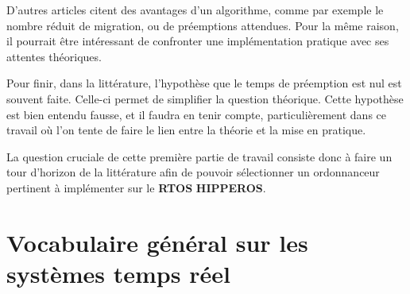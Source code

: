 \documentclass[11pt,a4paper,oneside]{report}
\begin{document}
	
	D'autres articles citent des avantages d'un algorithme, comme par exemple 
	le nombre réduit de migration, ou de préemptions attendues. Pour la même raison, 
	il pourrait être intéressant de confronter une implémentation pratique avec ses attentes 
	théoriques.\medskip
	
	Pour finir, dans la littérature, l'hypothèse que le temps de préemption est nul 
	est souvent faite. Celle-ci permet de simplifier la question théorique. 
	Cette hypothèse est bien entendu fausse, et il faudra en tenir compte, 
	particulièrement dans ce travail où l'on tente de faire 
	le lien entre la théorie et la mise en pratique.\medskip
	
	La question cruciale de cette première partie de travail 
	consiste donc à faire un tour d'horizon de la littérature afin de pouvoir 
	sélectionner un ordonnanceur pertinent à implémenter sur le \textbf{RTOS} \textbf{HIPPEROS}.
	
	\section{Vocabulaire général sur les systèmes temps réel}
	
\end{document}
